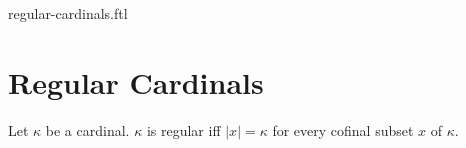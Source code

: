 \documentclass{naproche-library}
\begin{document}
\begin{smodule}{regular-cardinals.ftl}

  \section*{Regular Cardinals}

  \begin{definition}[forthel,id=SET_THEORY_06_6532641205487950]
    Let $\kappa$ be a cardinal.
    $\kappa$ is regular iff $|x| = \kappa$ for every cofinal subset $x$ of $\kappa$.
  \end{definition}
\end{smodule}
\end{document}
